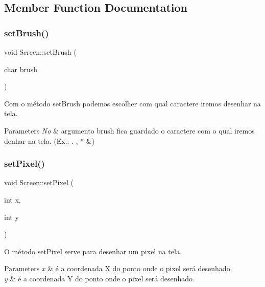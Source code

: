 \subsection{Member Function Documentation}
\mbox{\label{classScreen_a14a00e158f99df199772172554a20576}} 
\subsubsection{\texorpdfstring{set\+Brush()}{setBrush()}}
{\footnotesize\ttfamily void Screen\+::set\+Brush (\begin{DoxyParamCaption}\item[{char}]{brush }\end{DoxyParamCaption})}



Com o método set\+Brush podemos escolher com qual caractere iremos desenhar na tela. 


\begin{DoxyParams}{Parameters}
{\em No} & argumento brush fica guardado o caractere com o qual iremos denhar na tela. (Ex.\+: . , $\ast$ \&) \\
\hline
\end{DoxyParams}
\mbox{\label{classScreen_ae6bea81c57a22d226507c3c26fa95ee0}} 
\subsubsection{\texorpdfstring{set\+Pixel()}{setPixel()}}
{\footnotesize\ttfamily void Screen\+::set\+Pixel (\begin{DoxyParamCaption}\item[{int}]{x,  }\item[{int}]{y }\end{DoxyParamCaption})}



O método set\+Pixel serve para desenhar um pixel na tela. 


\begin{DoxyParams}{Parameters}
{\em x} & é a coordenada X do ponto onde o pixel será desenhado. \\
\hline
{\em y} & é a coordenada Y do ponto onde o pixel será desenhado. \\
\hline
\end{DoxyParams}


